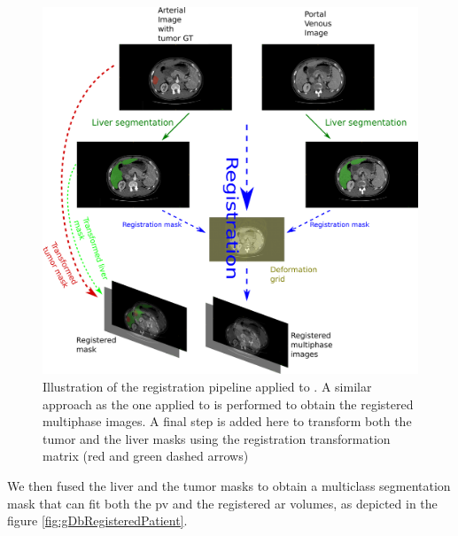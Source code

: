 \begin{figure}[th!]
\centering
\includegraphics[width=0.9\linewidth]{images/GDB/GDB_registration_pipeline_vertical}
\caption{Illustration of the registration pipeline applied to . A similar approach as the one applied to  is performed to obtain the registered multiphase images. A final step is added here to transform both the tumor and the liver masks using the registration transformation matrix (red and green dashed arrows)}
\label{fig:GDB_registration_pipeline_vertical}
\end{figure}

We then fused the liver and the tumor masks to obtain a multiclass
segmentation mask that can fit both the \ac{pv} and the registered \ac{ar} volumes, as depicted in the figure \ref{fig:gDbRegisteredPatient}.

